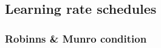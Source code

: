 \subsection{Learning rate schedules}

\begin{frame}\frametitle{Robinns \& Munro condition}

\begin{figure}[ht]
     \centering
     \begin{subfigure}[t]{0.35\textwidth}
         \centering
         \usebox{\imagebox}%
         \notesonly{\caption{}}
     \end{subfigure}
     \hspace{10mm}
     \begin{subfigure}[t]{0.5\textwidth}
         \centering
         \notesonly{\caption{}}
     \end{subfigure}
\end{figure}

    
\end{frame}


